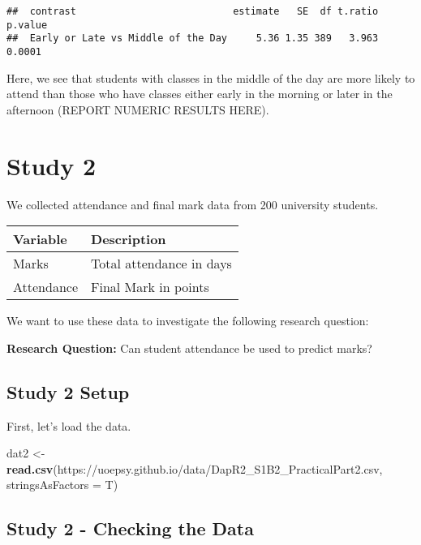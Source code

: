 \documentclass[
]{article}
\newenvironment{Shaded}{\begin{snugshade}}{\end{snugshade}}
\newcommand{\AttributeTok}[1]{\textcolor[rgb]{0.13,0.29,0.53}{#1}}
\newcommand{\FunctionTok}[1]{\textcolor[rgb]{0.13,0.29,0.53}{\textbf{#1}}}
\newcommand{\NormalTok}[1]{#1}
\newcommand{\OtherTok}[1]{\textcolor[rgb]{0.56,0.35,0.01}{#1}}
\newcommand{\StringTok}[1]{\textcolor[rgb]{0.31,0.60,0.02}{#1}}
\begin{document}
\begin{verbatim}
##  contrast                           estimate   SE  df t.ratio p.value
##  Early or Late vs Middle of the Day     5.36 1.35 389   3.963  0.0001
\end{verbatim}

Here, we see that students with classes in the middle of the day are more likely to attend than those who have classes either early in the morning or later in the afternoon (REPORT NUMERIC RESULTS HERE).

\hypertarget{study-2}{%
\section{Study 2}\label{study-2}}

We collected attendance and final mark data from 200 university students.

\begin{longtable}{ll}
\toprule
Variable & Description \\ 
\midrule
Marks & Total attendance in days \\ 
Attendance & Final Mark in points \\ 
\bottomrule
\end{longtable}

We want to use these data to investigate the following research question:

\textbf{Research Question:} Can student attendance be used to predict marks?

\hypertarget{study-2-setup}{%
\subsection{Study 2 Setup}\label{study-2-setup}}

First, let's load the data.

\begin{Shaded}
\begin{Highlighting}[]
\NormalTok{dat2 }\OtherTok{\textless{}{-}} \FunctionTok{read.csv}\NormalTok{(}\StringTok{\textquotesingle{}https://uoepsy.github.io/data/DapR2\_S1B2\_PracticalPart2.csv\textquotesingle{}}\NormalTok{, }\AttributeTok{stringsAsFactors =}\NormalTok{ T)}
\end{Highlighting}
\end{Shaded}

\hypertarget{study-2---checking-the-data}{%
\subsection{Study 2 - Checking the Data}\label{study-2---checking-the-data}}
\end{document}
